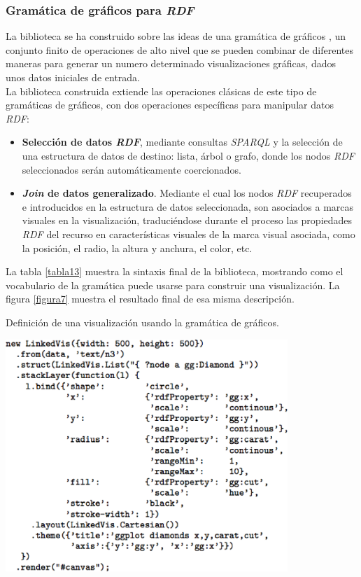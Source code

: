 \subsubsection{Gram\'atica de gr\'aficos para \textit{RDF}}

La biblioteca se ha construido sobre las ideas de una gram\'atica de gr\'aficos \cite{wilkinson2012grammar}, un conjunto finito de operaciones de alto nivel que se pueden combinar de diferentes maneras para generar un numero determinado visualizaciones gr\'aficas, dados unos datos iniciales de entrada.\\
La biblioteca construida extiende las operaciones cl\'asicas de este tipo de gram\'aticas de gr\'aficos,  con dos operaciones espec\'ificas para manipular datos \textit{RDF}:

\begin{itemize}
\item \textbf{Selecci\'on de datos \textit{RDF}}, mediante consultas \textit{SPARQL} y la selecci\'on de una estructura de datos de destino: lista, \'arbol o grafo, donde los nodos \textit{RDF} seleccionados ser\'an autom\'aticamente coercionados.
\item \textbf{\textit{Join} de datos generalizado}. Mediante el cual los nodos \textit{RDF} recuperados e introducidos en la estructura de datos seleccionada, son asociados a marcas visuales en la visualizaci\'on, traduci\'endose durante el proceso las propiedades \textit{RDF} del recurso en caracter\'isticas visuales de la marca visual asociada, como la posici\'on, el radio, la altura y anchura, el color, etc.
\end{itemize}

La tabla \ref{tabla13} muestra la sintaxis final de la biblioteca, mostrando como el vocabulario de la gram\'atica puede usarse para construir una visualizaci\'on. La figura \ref{figura7} muestra el resultado final de esa misma descripci\'on.\\

\begin{table}
\vspace{2.4in}
\caption{Definici\'on de una visualizaci\'on usando la gram\'atica de gr\'aficos.}
\includegraphics[width=0.8\textwidth]{tabla13}
\label{tabla13}
\end{table}

